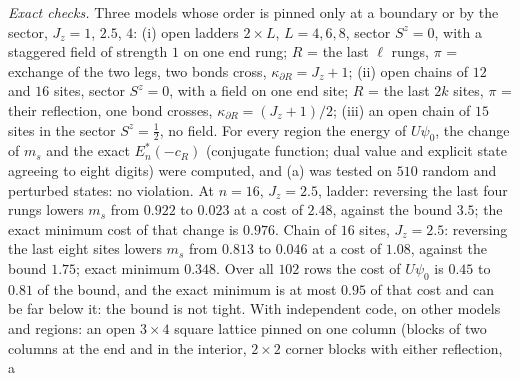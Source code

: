 \documentclass[aps,prx,onecolumn,10pt,nofootinbib,longbibliography,floatfix]{revtex4-2}
\theoremstyle{remark}
\newcommand{\Jz}{J_z}
\newcommand{\ms}{m_s}
\begin{document}
\emph{Exact checks.} Three models whose order is pinned only at a boundary or by the sector, $\Jz=1$, $2.5$, $4$:
(i) open ladders $2\times L$, $L=4,6,8$, sector $S^z=0$, with a staggered field of strength $1$ on one end rung; %
$R$ = the last $\ell$ rungs, $\pi$ = exchange of the two legs, two bonds cross, $\kappa_{\partial R}=\Jz+1$;
(ii) open chains of $12$ and $16$ sites, sector $S^z=0$, with a field on one end site; $R$ = the last $2k$ %
sites, $\pi$ = their reflection, one bond crosses, $\kappa_{\partial R}=(\Jz+1)/2$;
(iii) an open chain of $15$ sites in the sector $S^z=\frac12$, no field. For every region the energy of %
$U\psi_0$, the change of $\ms$ and the exact $E^*_n(-c_R)$ (conjugate function; dual value and explicit state
agreeing to eight digits) were computed, and (a) was tested on $510$ random and perturbed states: no violation. %
At $n=16$, $\Jz=2.5$, ladder: reversing the last four rungs lowers $\ms$ from $0.922$ to $0.023$ at a cost of %
$2.48$, against the bound $3.5$; the exact minimum cost of that change is $0.976$. Chain of $16$ sites, %
$\Jz=2.5$: reversing the last eight sites lowers $\ms$ from $0.813$ to $0.046$ at a cost of $1.08$, against the %
bound $1.75$; exact minimum $0.348$. Over all $102$ rows the cost of $U\psi_0$ is $0.45$ to $0.81$ of the bound, and %
the exact minimum is at most $0.95$ of that cost and can be far below it: the bound is not tight. %
With independent code, on other models and regions: an open $3\times4$ square lattice pinned on one column %
(blocks of two columns at the end and in the interior, $2\times2$ corner blocks with either reflection, a
\end{document}
